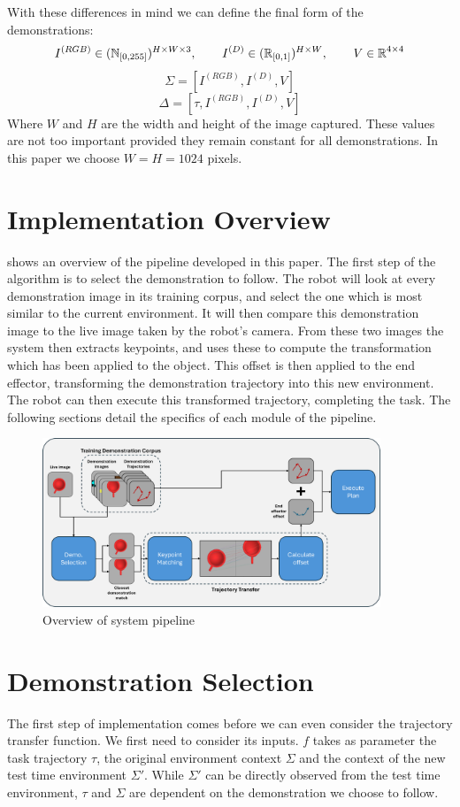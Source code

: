 With these differences in mind we can define the final form of the demonstrations:
$$I^{(RGB)} \in (\operatorname{\mathbb{N}}_{[0,255]})^{H \times W \times 3}, \operatorname{\operatorname{\: \: \: \:} \operatorname{\: \: \: \:}}
I^{(D)} \in (\operatorname{\mathbb{R}}_{[0,1]})^{H \times W}, \operatorname{\operatorname{\: \: \: \:} \operatorname{\: \: \: \:}}
V \in \operatorname{\mathbb{R}}^{4 \times 4}$$
$$\Sigma = [I^{(RGB)}, I^{(D)}, V]$$
$$\Delta = [\tau, I^{(RGB)}, I^{(D)}, V]$$
Where $W$ and $H$ are the width and height of the image captured. These values are not too important provided they remain constant for all demonstrations. In this paper we choose $W=H=1024$ pixels.


\section{Implementation Overview}
\label{sec:implementation}

 shows an overview of the pipeline developed in this paper. The first step of the algorithm is to select the demonstration to follow. The robot will look at every demonstration image in its training corpus, and select the one which is most similar to the current environment. It will then compare this demonstration image to the live image taken by the robot's camera. From these two images the system then extracts keypoints, and uses these to compute the transformation which has been applied to the object. This offset is then applied to the end effector, transforming the demonstration trajectory into this new environment. The robot can then execute this transformed trajectory, completing the task. The following sections detail the specifics of each module of the pipeline.

\begin{figure}[h]
    \centering
    \includegraphics[width=0.9\textwidth]{figures/pipeline.png}
    \caption{Overview of system pipeline}
    \label{fig:pipeline}
\end{figure}

\section{Demonstration Selection}
\label{sec:demo-selection}
The first step of implementation comes before we can even consider the trajectory transfer function. We first need to consider its inputs. $f$ takes as parameter the task trajectory $\tau$, the original environment context $\Sigma$ and the context of the new test time environment $\Sigma'$. While $\Sigma'$ can be directly observed from the test time environment, $\tau$ and $\Sigma$ are dependent on the demonstration we choose to follow.\\

